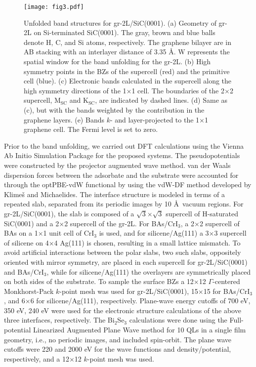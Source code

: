 \documentclass[aps,prb,showpacs,twocolumn,reprint,superscriptaddress]{revtex4-1}
\begin{document}
\begin{figure*}
  \texttt{[image: fig3.pdf]}
  \caption{Unfolded band structures for gr-2L/SiC(0001). 
  (a) Geometry of gr-2L on Si-terminated SiC(0001). 
  The gray, brown and blue balls denote H, C, and Si atoms, respectively.
  The graphene bilayer are in AB stacking with an interlayer distance of 3.35 \AA.
  W represents the spatial window for the band unfolding for the gr-2L.
  (b) High symmetry points in the BZs of the supercell (red) and the primitive cell (blue).
  (c) Electronic bands calculated in the supercell along the high symmetry directions of the 1$\times$1 cell.
The boundaries of the 2$\times$2 supercell, M$_\mathrm{SC}$ and K$_\mathrm{SC}$, are indicated by dashed lines.
  (d) Same as (c), but with the bands weighted by the contribution in the graphene layers.
  (e) Bands $k$- and layer-projected to the 1$\times$1 graphene cell.
  The Fermi level is set to zero. 
  }
 \label{fig3}
\end{figure*}


Prior to the band unfolding, we carried out DFT calculations using the Vienna Ab Initio Simulation Package
\cite{kresse1996} for the proposed systems.  The pseudopotentials were constructed by the projector augmented
wave method.\cite{bloechl1994,kresse1999} van der Waals dispersion forces between the adsorbate and the
substrate were accounted for through the optPBE-vdW functional by using the vdW-DF method developed by
Klime\v{s} and Michaelides.\cite{klimes2010,klimes2011} The interface structure is modeled in terms of a
repeated slab, separated from its periodic images by 10 \AA\ vacuum regions.  For gr-2L/SiC(0001), the slab is
composed of a $\sqrt{3}$$\times$$\sqrt{3}$ supercell of H-saturated SiC(0001) and a  2$\times$2 supercell of the
gr-2L.  For BAs/CrI$_3$,  a  2$\times$2 supercell of BAs on a  1$\times$1 unit cell of CrI$_3$ is used, and
for silicene/Ag(111) a 3$\times$3 supercell of silicene on 4$\times$4 Ag(111) is chosen, resulting in a small
lattice mismatch.  To avoid artificial interactions between the polar slabs, two such slabs, oppositely
oriented with mirror symmetry, are placed in each supercell for gr-2L/SiC(0001) and BAs/CrI$_3$,  while for
silicene/Ag(111) the overlayers are symmetrically placed on both sides of the substrate.  To sample the surface
BZs a 12$\times$12 $\Gamma$-centered Monkhorst-Pack $k$-point mesh was used for gr-2L/SiC(0001), 15$\times$15
for BAs/CrI$_3$, and 6$\times$6 for silicene/Ag(111), respectively.  Plane-wave energy cutoffs of 700 eV, 350
eV, 240 eV were used for the electronic structure calculations of the above three interfaces, respectively.
The Bi$_2$Se$_3$ calculations were done using the Full-potential Linearized Augmented Plane Wave \cite{FLAPW}
method for 10 QLs in a single film geometry, i.e., no periodic images, and included spin-orbit. The plane wave
cutoffs were 220 and 2000 eV for the wave functions and density/potential, respectively, and a 12$\times$12
$k$-point mesh was used.
\end{document}
